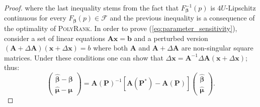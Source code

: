 \documentclass[twoside,11pt]{article}
\begin{document}
\begin{proof}
where the last inequality stems from the fact that $F^{-1}_{\boldsymbol{ \beta}}(p)$ is $4U$-Lipschitz continuous  for every $F_{\boldsymbol{ \beta}}(p) \in \mathcal{F}$ and the previous inequality is a consequence of the optimality of \textsc{PolyRank}. In order to prove (\ref{eq:parameter_sensitivity}), consider a set of linear equations $\boldsymbol{A} \boldsymbol{x} = \boldsymbol{b}$ and a perturbed version $(\boldsymbol{A}+\Delta \boldsymbol{A})(\boldsymbol{x}+\Delta \boldsymbol{x}) = b$ where both $\boldsymbol{A}$ and $\boldsymbol{A}+\Delta \boldsymbol{A}$ are non-singular square matrices. Under these conditions one can show that $\Delta \boldsymbol{x} = \boldsymbol{A}^{-1}\Delta \boldsymbol{A}(\boldsymbol{x}+\Delta \boldsymbol{x})$; %
thus:%
\begin{equation}
\label{eq:relation}
\left(\begin{array}{c}
     \boldsymbol{\hat{\beta}} -\boldsymbol{\beta}\\
     \boldsymbol{\hat{\mu}} -\boldsymbol{\mu} 
\end{array}\right) = \boldsymbol{A}(\boldsymbol{P})^{-1}[\boldsymbol{A}(\boldsymbol{P^*}) - \boldsymbol{A}(\boldsymbol{P})]\left(\begin{array}{c}
     \boldsymbol{\hat{\beta}} \\
     \boldsymbol{\hat{\mu}} 
\end{array}\right).
\end{equation}

\end{proof}
\end{document}
